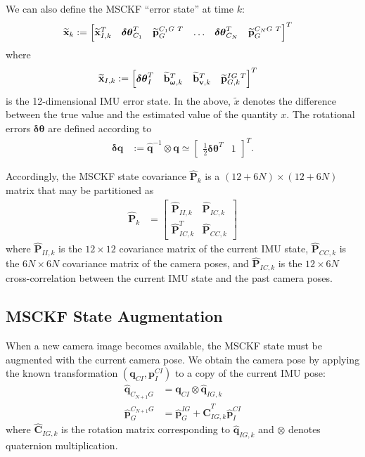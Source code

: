 \documentclass[letterpaper, 10 pt, conference]{ieeeconf}  %
\def\Vec#1{\mathbf{#1}}
\newcommand{\bbm}{\begin{bmatrix}}
\newcommand{\ebm}{\end{bmatrix}}
\begin{document}
We can also define the MSCKF ``error state'' at time $k$:
\begin{align*}
    \widetilde{\Vec{x}}_k &:= \bbm \widetilde{\Vec{x}}_{I,k}^T & \boldsymbol{\delta\theta}_{C_1}^T & \widetilde{\Vec{p}}_G^{C_1 G \hspace{0.3em} T} & \hdots & \boldsymbol{\delta\theta}_{C_N}^T & \widetilde{\Vec{p}}_G^{C_N G \hspace{0.3em} T} \ebm ^T
\end{align*}
where
\begin{align}
    \widetilde{\Vec{x}}_{I,k} &:= \bbm \boldsymbol{\delta\theta}_I^T & \widetilde{\Vec{b}}_{\boldsymbol{\omega},k}^T & \widetilde{\Vec{b}}_{\Vec{v},k}^T & \widetilde{\Vec{p}}_{G,k}^{IG \hspace{0.3em} T} \ebm^T
\end{align}
is the 12-dimensional IMU error state.
In the above, $\widetilde{x}$ denotes the difference between the true value and the estimated value of the quantity $x$.
The rotational errors $\boldsymbol{\delta\theta}$ are defined according to
\begin{align}
    \boldsymbol{\delta}\Vec{q} &:= \hat{\Vec{q}}^{-1} \otimes \Vec{q} \simeq \bbm \frac{1}{2}\boldsymbol{\delta\theta}^T & 1 \ebm^T.
\end{align}

Accordingly, the MSCKF state covariance $\hat{\Vec{P}}_k$ is a $(12+6N)\times(12+6N)$ matrix that may be partitioned as
\begin{align} \label{eq:covariance}
    \hat{\Vec{P}}_k &= \bbm \hat{\Vec{P}}_{II,k} & \hat{\Vec{P}}_{IC,k} \\ \hat{\Vec{P}}_{IC,k}^T & \hat{\Vec{P}}_{CC,k} \ebm
\end{align}
where $\hat{\Vec{P}}_{II,k}$ is the $12\times12$ covariance matrix of the current IMU state, $\hat{\Vec{P}}_{CC,k}$ is the $6N\times6N$ covariance matrix of the camera poses, and $\hat{\Vec{P}}_{IC,k}$ is the $12\times6N$ cross-correlation between the current IMU state and the past camera poses.

\subsection{MSCKF State Augmentation}
When a new camera image becomes available, the MSCKF state must be augmented with the current camera pose.
We obtain the camera pose by applying the known transformation $\left(\Vec{q}_{CI}, \Vec{p}_I^{CI}\right)$ to a copy of the current IMU pose:
\begin{align}
    \hat{\Vec{q}}_{C_{N+1} G} &= \Vec{q}_{CI} \otimes \hat{\Vec{q}}_{IG,k} \\
    \hat{\Vec{p}}_G^{C_{N+1}G} &= \hat{\Vec{p}}_G^{IG} + \hat{\Vec{C}}_{IG,k}^T \hat{\Vec{p}}_I^{CI}
\end{align}
where $\hat{\Vec{C}}_{IG,k}$ is the rotation matrix corresponding to $\hat{\Vec{q}}_{IG,k}$ and $\otimes$ denotes quaternion multiplication.
\end{document}
